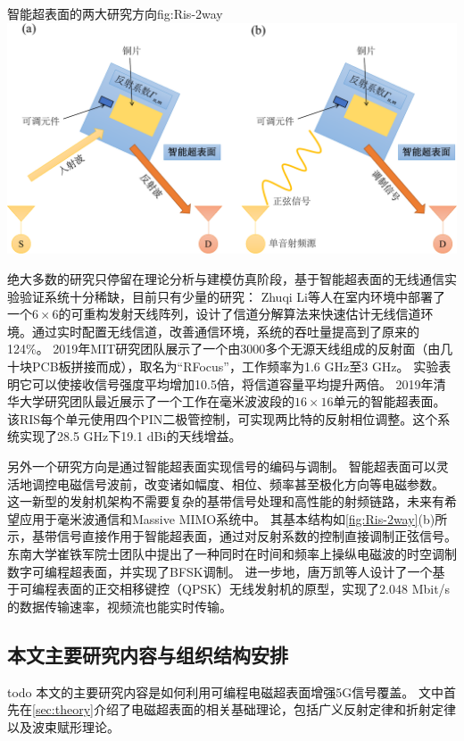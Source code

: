 \documentclass[supercite]{HustGraduPaper}
\begin{document}
\begin{generalfig}[htb]{智能超表面的两大研究方向}{fig:Ris-2way}
	\includegraphics[width=0.8\linewidth]{Figures/Ris-2way.pdf}
\end{generalfig}

绝大多数的研究只停留在理论分析与建模仿真阶段，基于智能超表面的无线通信实验验证系统十分稀缺，目前只有少量的研究：
Zhuqi Li等人在室内环境中部署了一个$ 6 \times 6 $的可重构发射天线阵列，设计了信道分解算法来快速估计无线信道环境\cite{li2019towards}。通过实时配置无线信道，改善通信环境，系统的吞吐量提高到了原来的124\%。
2019年MIT研究团队展示了一个由3000多个无源天线组成的反射面（由几十块PCB板拼接而成），取名为“RFocus”，工作频率为1.6 GHz至3 GHz。
实验表明它可以使接收信号强度平均增加10.5倍，将信道容量平均提升两倍\cite{arun2019rfocus}。
2019年清华大学研究团队最近展示了一个工作在毫米波波段的$ 16 \times 16 $单元的智能超表面。
该RIS每个单元使用四个PIN二极管控制，可实现两比特的反射相位调整。这个系统实现了28.5 GHz下19.1 dBi的天线增益\cite{Dai2020}。

另外一个研究方向是通过智能超表面实现信号的编码与调制。
智能超表面可以灵活地调控电磁信号波前，改变诸如幅度、相位、频率甚至极化方向等电磁参数\cite{CHN_zhou2020}。
这一新型的发射机架构不需要复杂的基带信号处理和高性能的射频链路，未来有希望应用于毫米波通信和Massive MIMO系统中。
其基本结构如\autoref{fig:Ris-2way}(b)所示，基带信号直接作用于智能超表面，通过对反射系数的控制直接调制正弦信号。
东南大学崔铁军院士团队中提出了一种同时在时间和频率上操纵电磁波的时空调制数字可编程超表面，并实现了BFSK调制\cite{zhao2019programmable}。
进一步地，唐万凯等人设计了一个基于可编程表面的正交相移键控（QPSK）无线发射机的原型，实现了2.048 Mbit/s的数据传输速率，视频流也能实时传输\cite{Tang2019Wireless}。

\subsection{本文主要研究内容与组织结构安排}
todo
本文的主要研究内容是如何利用可编程电磁超表面增强5G信号覆盖。
文中首先在\autoref{sec:theory}介绍了电磁超表面的相关基础理论，包括广义反射定律和折射定律以及波束赋形理论。
\end{document}
